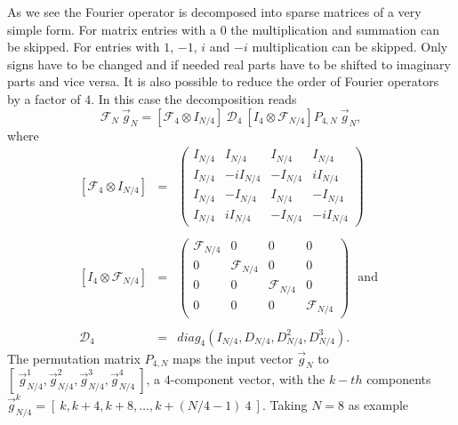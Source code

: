 As we see the Fourier operator is decomposed into sparse matrices of 
a very simple form. For matrix entries with a $0$ the multiplication and
summation can be skipped. For entries with $1$, $-1$, $i$ and $-i$ 
multiplication can be skipped. Only signs have to be changed and if needed
real parts have to be shifted to imaginary parts and vice versa. 
It is also possible to reduce the order of Fourier operators by a
factor of $4$. In this case the decomposition reads     
\begin{equation} \label{eq_FNFNr4}
 \mathcal{F}_{N} \ \vec{g}_{N} 
   = 
 \left[
  \mathcal{F}_{4} \otimes I_{N/4}
 \right] \ 
 \mathcal{D}_{4} \
 \left[
  I_{4} \otimes \mathcal{F}_{N/4}
 \right] 
 P_{4,N} \ \vec{g}_{N},
\end{equation}
where 
\begin{eqnarray} \label{eq_FNFNr4def01}
 \left[
  \mathcal{F}_{4} \otimes I_{N/4}
 \right]
 &=&
 \left(
  \begin{array}{rrrr}
   I_{N/4} & I_{N/4} & I_{N/4} & I_{N/4} 
   \\
   I_{N/4} & -iI_{N/4} & -I_{N/4} & iI_{N/4} 
   \\
   I_{N/4} & -I_{N/4} & I_{N/4} & -I_{N/4} 
   \\
   I_{N/4} & iI_{N/4} & -I_{N/4} & -iI_{N/4} 
  \end{array}
 \right) \ 
  \\  
  \\  \label{eq_FNFNr4def02}
 \left[
  I_{4} \otimes \mathcal{F}_{N/4}
 \right]
 &=&
 \left(
  \begin{array}{cccc}
   \mathcal{F}_{N/4} &  0  &   0  &  0
   \\
       0   & \mathcal{F}_{N/4} & 0 & 0
   \\
       0   &   0   & \mathcal{F}_{N/4} & 0
   \\
       0   &   0     &  0  &  \mathcal{F}_{N/4}
  \end{array}
 \right) \ \ \ \mbox{and} \ \ 
  \\  
  \\  \label{eq_FNFNr4def03}
 \mathcal{D}_{4} 
 &=&
 diag_{4} \left(I_{N/4},D_{N/4},D^{2}_{N/4},D^{3}_{N/4} \right).
\end{eqnarray}
The permutation matrix $P_{4,N}$ maps the input vector $\vec{g}_{N}$ to
$\left[ \ \vec{g}^{1}_{N/4},\vec{g}^{2}_{N/4},
\vec{g}^{3}_{N/4},\vec{g}^{4}_{N/4} \ \right]$, a $4$-component vector, with
the $k-th$ components $\vec{g}^{k}_{N/4} = 
\left[ \ k,k+4,k+8, \dots ,k+ (N/4 - 1) \ 4 \  \right]$. Taking $N=8$ as example

